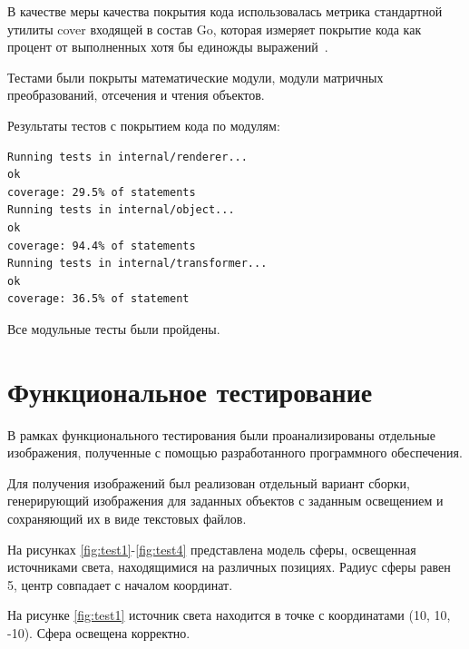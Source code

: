 В качестве меры качества покрытия кода использовалась метрика стандартной утилиты cover входящей в состав Go, которая измеряет покрытие кода как процент от выполненных хотя бы единожды выражений~\cite{cover}.

Тестами были покрыты математические модули, модули матричных преобразований, отсечения и чтения объектов.

Результаты тестов с покрытием кода по модулям:

\begin{verbatim}
Running tests in internal/renderer...
ok
coverage: 29.5% of statements
Running tests in internal/object...
ok
coverage: 94.4% of statements
Running tests in internal/transformer...
ok
coverage: 36.5% of statement
\end{verbatim}

Все модульные тесты были пройдены.

\section{Функциональное тестирование}

В рамках функционального тестирования были проанализированы отдельные изображения, полученные с помощью разработанного программного обеспечения.

Для получения изображений был реализован отдельный вариант сборки, генерирующий изображения для заданных объектов с заданным освещением и сохраняющий их в виде текстовых файлов.

На рисунках \ref{fig:test1}-\ref{fig:test4} представлена модель сферы, освещенная источниками света, находящимися на различных позициях. Радиус сферы равен 5, центр совпадает с началом координат.

На рисунке \ref{fig:test1} источник света находится в точке с координатами (10, 10, -10). Сфера освещена корректно.

